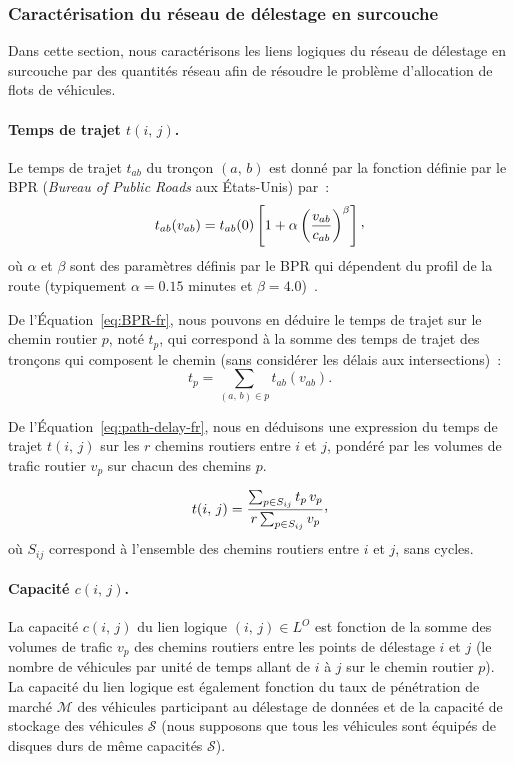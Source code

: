  
\subsubsection{Caractérisation du réseau de délestage en surcouche} 
 
 
Dans cette section, nous caractérisons les liens logiques du réseau de délestage en surcouche par des quantités réseau afin de résoudre le problème d’allocation de flots de véhicules. 
 
 
\paragraph{Temps de trajet $t(i,\,j)$.} 
Le temps de trajet $t_{ab}$ du tronçon $(a,\,b)$ est donné par la fonction définie par le BPR (\textit{Bureau of Public Roads} aux États-Unis) par~: 
\begin{equation} 
  \label{eq:BPR-fr} 
  t_{ab}(v_{ab})=t_{ab}(0)\left[1+\alpha\left(\frac{v_{ab}}{c_{ab}}\right)^{\beta}\right]\Comma 
\end{equation} 
\noindent où $\alpha$ et $\beta$ sont des paramètres définis par le BPR qui dépendent du profil de la route (typiquement $\alpha = 0.15$ minutes et $\beta = 4.0$)~\cite{HCM00}. 
 
 
De l’Équation~\ref{eq:BPR-fr}, nous pouvons en déduire le temps de trajet sur le chemin routier $p$, noté $t_{p}$, qui correspond à la somme des temps de trajet des tronçons qui composent le chemin (sans considérer les délais aux intersections)~:
\begin{equation} 
  \label{eq:path-delay-fr} 
  t_{p} = \sum_{(a,\,b)\in p} t_{ab}(v_{ab}). 
\end{equation} 
 
 
De l’Équation~\ref{eq:path-delay-fr}, nous en déduisons une expression du temps de trajet $t(i,\,j)$ sur les $r$ chemins routiers entre $i$ et $j$, pondéré par les volumes de trafic routier $v_{p}$ sur chacun des chemins $p$. 
 
 
\begin{equation} 
  t(i,\,j) = \frac{\sum_{p\in S_{ij}} t_{p}\,v_{p}}{r\sum_{p\in S_{ij}}v_{p}}\Comma 
\end{equation} 
\noindent où $S_{ij}$ correspond à l’ensemble des chemins routiers entre $i$ et $j$, sans cycles. 
 
 
 
 
\paragraph{Capacité $c(i,\,j)$.} 
La capacité $c(i,\,j)$ du lien logique $(i,\,j)\in L^{O}$ est fonction de la somme des volumes de trafic $v_{p}$  des chemins routiers entre les points de délestage $i$ et $j$ (\ie le nombre de véhicules par unité de temps allant de $i$ à $j$ sur le chemin routier $p$). La capacité du lien logique est également fonction du taux de pénétration de marché $\mathcal{M}$ des véhicules participant au délestage de données et de la capacité de stockage des véhicules $\mathcal{S}$ (nous supposons que tous les véhicules sont équipés de disques durs de même capacités $\mathcal{S}$). 
 
